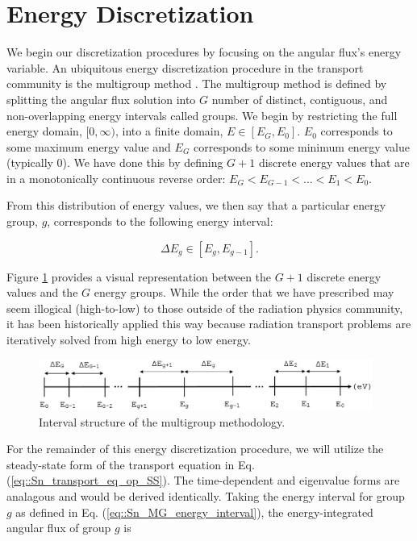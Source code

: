 \section{Energy Discretization}
\label{sec::Sn_MG}

We begin our discretization procedures by focusing on the angular flux's energy variable. An ubiquitous energy discretization procedure in the transport community is the multigroup method \cite{duderstadt1976nuclear,lewis1984computational}. The multigroup method is defined by splitting the angular flux solution into $G$ number of distinct, contiguous, and non-overlapping energy intervals called groups. We begin by restricting the full energy domain, $[0, \infty)$, into a finite domain, $E \in [E_G, E_0]$. $E_0$ corresponds to some maximum energy value and $E_G$ corresponds to some minimum energy value (typically 0). We have done this by defining $G+1$ discrete energy values that are in a monotonically continuous reverse order: $E_G < E_{G-1} <  \ldots < E_1 < E_0$. 

From this distribution of energy values, we then say that a particular energy group, $g$, corresponds to the following energy interval:

\begin{equation}
\label{eq::Sn_MG_energy_interval}
\Delta E_g \in [E_g, E_{g-1}].
\end{equation}

\noindent Figure \ref{fig::Sn_MG_energy_bands} provides a visual representation between the $G+1$ discrete energy values and the $G$ energy groups. While the order that we have prescribed may seem illogical (high-to-low) to those outside of the radiation physics community, it has been historically applied this way because radiation transport problems are iteratively solved from high energy to low energy.

\begin{figure}[bht]
\centering
\includegraphics[width=0.975\textwidth]{figures/sec_Sn/MG_Energy_Bands.eps}
\caption{Interval structure of the multigroup methodology.}
\label{fig::Sn_MG_energy_bands}
\end{figure}

For the remainder of this energy discretization procedure, we will utilize the steady-state form of the transport equation in Eq. (\ref{eq::Sn_transport_eq_op_SS}). The time-dependent and eigenvalue forms are analagous and would be derived identically. Taking the energy interval for group $g$ as defined in Eq. (\ref{eq::Sn_MG_energy_interval}), the energy-integrated angular flux of group $g$ is

